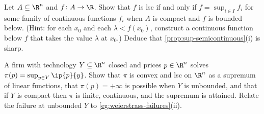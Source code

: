 \begin{exercise}\label{ex:cont-2}
	Let $A\subseteq\R^n$ and $f\colon A\to\R$. Show that $f$ is lsc if and only if
	$f=\sup_{i\in I}f_i$ for some family of continuous functions $f_i$ when $A$ is
	compact and $f$ is bounded below. (Hint: for each $x_0$ and each
	$\lambda<f(x_0)$, construct a continuous function below $f$ that takes the value
	$\lambda$ at $x_0$.) Deduce that \autoref{prop:sup-semicontinuous}(i) is sharp.
\end{exercise}

\begin{exercise}\label{ex:cont-3}
	A firm with technology $Y\subseteq\R^n$ closed and prices $p\in\R^n$ solves
	$\pi(p)=\sup_{y\in Y}\ip{p}{y}$. Show that $\pi$ is convex and lsc on $\R^n$ as a
	supremum of linear functions, that $\pi(p)=+\infty$ is possible when $Y$ is
	unbounded, and that if $Y$ is compact then $\pi$ is finite, continuous, and the
	supremum is attained. Relate the failure at unbounded $Y$ to
	\autoref{eg:weierstrass-failures}(ii).
\end{exercise}
